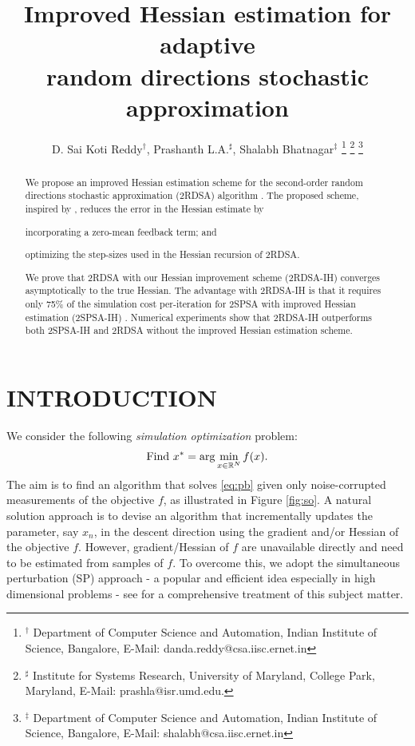 \documentclass[letterpaper, 10 pt, conference]{ieeeconf}  %
\title{\LARGE \bf
Improved Hessian estimation for adaptive \\random directions stochastic approximation
}
\author{D. Sai Koti Reddy$^\dagger$, Prashanth L.A.$^\sharp$, Shalabh Bhatnagar$^\ddag$
\thanks{
$^\dagger$ Department of Computer Science and Automation,
Indian Institute of Science, Bangalore,
E-Mail: danda.reddy@csa.iisc.ernet.in}
\thanks{
$^\sharp$ Institute for Systems Research, University of Maryland, College Park, Maryland,
E-Mail: prashla@isr.umd.edu.
}
\thanks{
$^\ddag$ Department of Computer Science and Automation,
Indian Institute of Science, Bangalore,
E-Mail: shalabh@csa.iisc.ernet.in
}
}
\begin{document}
\maketitle
\thispagestyle{empty}
\pagestyle{empty}


\begin{abstract}
We propose an improved Hessian estimation scheme for the second-order random directions stochastic approximation (2RDSA) algorithm \cite{prashanth2015rdsa}. The proposed scheme, inspired by \cite{spall-jacobian}, reduces the error in the Hessian estimate by 
\begin{inparaenum}[\bfseries (i)]
	\item incorporating a zero-mean feedback term; and
	\item optimizing the step-sizes used in the Hessian recursion of 2RDSA.
\end{inparaenum}
We prove that 2RDSA with our Hessian improvement scheme (2RDSA-IH) converges asymptotically to the true Hessian.
The advantage with 2RDSA-IH is that it requires only 75\% of the simulation cost per-iteration for 2SPSA with improved Hessian estimation (2SPSA-IH) \cite{spall-jacobian}.
Numerical experiments show that 2RDSA-IH outperforms both 2SPSA-IH and 2RDSA without the improved Hessian estimation scheme.
\end{abstract}


\section{INTRODUCTION}
We consider the following \textit{simulation optimization} problem:
\begin{align}
\mbox{Find } x^* = \arg\min_{x \in \mathbb{R}^N} f(x). \label{eq:pb}
\end{align}
The aim is to find an algorithm that solves \eqref{eq:pb} given only noise-corrupted measurements of the objective $f$, as illustrated in Figure \ref{fig:so}.
A natural solution approach is to devise an algorithm that incrementally updates the parameter, say $x_n$, in the descent direction using the gradient and/or Hessian of the objective $f$. However, gradient/Hessian of $f$ are unavailable directly and need to be estimated from samples of $f$. 
To overcome this, we adopt the simultaneous perturbation (SP) approach - a popular and efficient idea especially in high dimensional problems - see \cite{bhatnagar-book} for a comprehensive treatment of this subject matter. 
\end{document}
